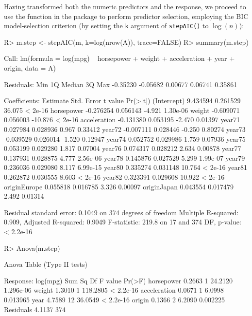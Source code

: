 \documentclass[
]{jss}
\begin{document}
Having transformed both the numeric predictors and the response, we
proceed to use the  function in the  package
to perform predictor selection, employing the BIC model-selection
criterion (by setting the \texttt{k} argument of \texttt{stepAIC()} to
\(\log(n)\)):

\begin{CodeChunk}
\begin{CodeInput}
R> m.step <- stepAIC(m, k=log(nrow(A)), trace=FALSE)
R> summary(m.step)
\end{CodeInput}
\begin{CodeOutput}

Call:
lm(formula = log(mpg) ~ horsepower + weight + acceleration + 
    year + origin, data = A)

Residuals:
     Min       1Q   Median       3Q      Max 
-0.35230 -0.05682  0.00677  0.06741  0.35861 

Coefficients:
              Estimate Std. Error t value Pr(>|t|)
(Intercept)   9.434594   0.261529  36.075  < 2e-16
horsepower   -0.276254   0.056143  -4.921 1.30e-06
weight       -0.609071   0.056003 -10.876  < 2e-16
acceleration -0.131380   0.053195  -2.470  0.01397
year71        0.027984   0.028936   0.967  0.33412
year72       -0.007111   0.028446  -0.250  0.80274
year73       -0.039529   0.026014  -1.520  0.12947
year74        0.052752   0.029986   1.759  0.07936
year75        0.053199   0.029280   1.817  0.07004
year76        0.074317   0.028212   2.634  0.00878
year77        0.137931   0.028875   4.777 2.56e-06
year78        0.145876   0.027529   5.299 1.99e-07
year79        0.236036   0.029080   8.117 6.99e-15
year80        0.335274   0.031148  10.764  < 2e-16
year81        0.262872   0.030555   8.603  < 2e-16
year82        0.323391   0.029608  10.922  < 2e-16
originEurope  0.055818   0.016785   3.326  0.00097
originJapan   0.043554   0.017479   2.492  0.01314

Residual standard error: 0.1049 on 374 degrees of freedom
Multiple R-squared:  0.909, Adjusted R-squared:  0.9049 
F-statistic: 219.8 on 17 and 374 DF,  p-value: < 2.2e-16
\end{CodeOutput}
\begin{CodeInput}
R> Anova(m.step)
\end{CodeInput}
\begin{CodeOutput}
Anova Table (Type II tests)

Response: log(mpg)
             Sum Sq  Df  F value    Pr(>F)
horsepower   0.2663   1  24.2120 1.296e-06
weight       1.3010   1 118.2805 < 2.2e-16
acceleration 0.0671   1   6.0998  0.013965
year         4.7589  12  36.0549 < 2.2e-16
origin       0.1366   2   6.2090  0.002225
Residuals    4.1137 374                   
\end{CodeOutput}
\end{CodeChunk}
\end{document}
